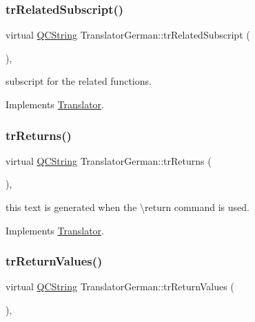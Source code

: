 \subsubsection{\texorpdfstring{trRelatedSubscript()}{trRelatedSubscript()}}
{\footnotesize\ttfamily virtual \mbox{\hyperlink{class_q_c_string}{Q\+C\+String}} Translator\+German\+::tr\+Related\+Subscript (\begin{DoxyParamCaption}{ }\end{DoxyParamCaption})\hspace{0.3cm}{\ttfamily [inline]}, {\ttfamily [virtual]}}

subscript for the related functions. 

Implements \mbox{\hyperlink{class_translator}{Translator}}.

\mbox{\label{class_translator_german_a7db669973f51efbfcd1995376be72719}} 
\subsubsection{\texorpdfstring{trReturns()}{trReturns()}}
{\footnotesize\ttfamily virtual \mbox{\hyperlink{class_q_c_string}{Q\+C\+String}} Translator\+German\+::tr\+Returns (\begin{DoxyParamCaption}{ }\end{DoxyParamCaption})\hspace{0.3cm}{\ttfamily [inline]}, {\ttfamily [virtual]}}

this text is generated when the \textbackslash{}return command is used. 

Implements \mbox{\hyperlink{class_translator}{Translator}}.

\mbox{\label{class_translator_german_a993490300dcf760ae1a7e45dc034157e}} 
\subsubsection{\texorpdfstring{trReturnValues()}{trReturnValues()}}
{\footnotesize\ttfamily virtual \mbox{\hyperlink{class_q_c_string}{Q\+C\+String}} Translator\+German\+::tr\+Return\+Values (\begin{DoxyParamCaption}{ }\end{DoxyParamCaption})\hspace{0.3cm}{\ttfamily [inline]}, {\ttfamily [virtual]}}


